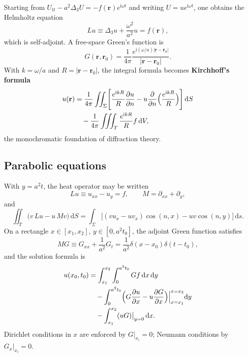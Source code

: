 \begin{example}
Starting from $U_{tt}-a^2\Delta_3 U=-f(\mathbf{r})e^{\mathrm{i}\omega t}$ and writing $U=ue^{\mathrm{i}\omega t}$, one obtains the Helmholtz equation
\begin{equation}
Lu\equiv\Delta_3 u+\frac{\omega^2}{a^2}u=f(\mathbf{r}),
\end{equation}
which is self-adjoint. A free-space Green's function is
\begin{equation}
G(\mathbf{r},\mathbf{r}_0)=\frac{1}{4\pi}\frac{e^{\mathrm{i}(\omega/a)|\mathbf{r}-\mathbf{r}_0|}}{|\mathbf{r}-\mathbf{r}_0|}.
\end{equation}
With $k=\omega/a$ and $R=|\mathbf{r}-\mathbf{r}_0|$, the integral formula becomes \textbf{Kirchhoff's formula}
\begin{equation}
\begin{aligned}
u(\mathbf{r})
&=\frac{1}{4\pi}\iint_{\Sigma}\Biggl[
\frac{e^{\mathrm{i}kR}}{R}\frac{\partial u}{\partial n}
-u\frac{\partial}{\partial n}\Bigl(\frac{e^{\mathrm{i}kR}}{R}\Bigr)
\Biggr]\,\mathrm{d}S\\
&\quad-\frac{1}{4\pi}\iiint_{T}\frac{e^{\mathrm{i}kR}}{R}f\,\mathrm{d}V,
\end{aligned}
\end{equation}
the monochromatic foundation of diffraction theory.
\end{example}

\subsection{Parabolic equations}

With $y=a^2 t$, the heat operator may be written
\begin{equation}
Lu\equiv u_{xx}-u_y=f,
\qquad
M=\partial_{xx}+\partial_y,
\end{equation}
and
\begin{equation}
\iint_{T}\bigl(v\,Lu-u\,Mv\bigr)\,\mathrm{d}S
=\int_{\Sigma}\bigl[(vu_x-uv_x)\cos(n,x)-uv\cos(n,y)\bigr]\,\mathrm{d}s.
\end{equation}
On a rectangle $x\in[x_1,x_2]$, $y\in[0,a^2 t_0]$, the adjoint Green function satisfies
\begin{equation}
MG\equiv G_{xx}+\frac{1}{a^2}G_t
=\frac{1}{a^2}\delta(x-x_0)\delta(t-t_0),
\end{equation}
and the solution formula is
\begin{equation}
\begin{aligned}
u(x_0,t_0)
&=\int_{x_1}^{x_2}\int_0^{a^2 t_0}Gf\,\mathrm{d}x\,\mathrm{d}y\\
&\quad-\int_0^{a^2 t_0}\Bigl(G\frac{\partial u}{\partial x}-u\frac{\partial G}{\partial x}\Bigr)\Big|_{x=x_1}^{x=x_2}\mathrm{d}y\\
&\quad-\int_{x_1}^{x_2}(uG)\big|_{y=0}\,\mathrm{d}x.
\end{aligned}
\end{equation}
Dirichlet conditions in $x$ are enforced by $G|_{x_i}=0$; Neumann conditions by $G_x|_{x_i}=0$.

